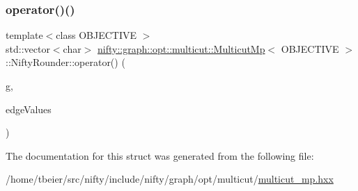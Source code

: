 \subsubsection{\texorpdfstring{operator()()}{operator()()}}
{\footnotesize\ttfamily template$<$class O\+B\+J\+E\+C\+T\+I\+VE $>$ \\
std\+::vector$<$char$>$ \hyperlink{classnifty_1_1graph_1_1opt_1_1multicut_1_1MulticutMp}{nifty\+::graph\+::opt\+::multicut\+::\+Multicut\+Mp}$<$ O\+B\+J\+E\+C\+T\+I\+VE $>$\+::Nifty\+Rounder\+::operator() (\begin{DoxyParamCaption}\item[{\hyperlink{structnifty_1_1graph_1_1opt_1_1multicut_1_1MulticutMp_1_1NiftyRounder_ace21bc91acedd0262f69e9ce90d44470}{Graph\+Type} \&\&}]{g,  }\item[{std\+::vector$<$ double $>$ \&\&}]{edge\+Values }\end{DoxyParamCaption})\hspace{0.3cm}{\ttfamily [inline]}}



The documentation for this struct was generated from the following file\+:\begin{DoxyCompactItemize}
\item 
/home/tbeier/src/nifty/include/nifty/graph/opt/multicut/\hyperlink{multicut__mp_8hxx}{multicut\+\_\+mp.\+hxx}\end{DoxyCompactItemize}
